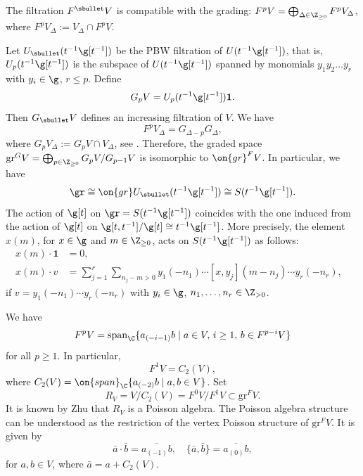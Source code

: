 The filtration $F^\sbullet V$
is compatible with the grading:
$F^pV=\bigoplus_{\Delta\in \Z_{\geq 0}}F^pV_{\Delta}$,
where
$F^p V_\Delta := V_\Delta \cap F^p V$.

Let $U_{\sbullet}(t^{-1}\g[t^{-1}])$ be the PBW filtration of
$U(t^{-1}\g[t^{-1}])$,
that is,
$U_{p}(t^{-1}\g[t^{-1}])$
is the subspace of $U(t^{-1}\g[t^{-1}])$
spanned by monomials $y_{1} y_{2} \dots y_{r}$ with $y_i \in \g$,
$r\leq p$.
Define
\begin{equation*}
G_p V= U_{p}(t^{-1}\g[t^{-1}])\mathbf{1}.
\end{equation*}
Then $G_\sbullet V$ defines an increasing filtration of $V$.
We have
\begin{equation}
F^p V_{\Delta}=G_{\Delta-p}G_{\Delta},
\end{equation}
where
$G_p V_{\Delta}:=G_p V\cap V_{\Delta}$,
see \cite[Prop.\,2.6.1]{Ara12}.
Therefore,
the graded space $\mathrm{gr}^G V = \bigoplus_{p \in \Z_{\geq 0}}
G_p V/G_{p-1}V$ is isomorphic to $\on{gr}^F V$.
In particular,
we have
\[
\gr\cong \on{gr}U_{\sbullet}(t^{-1}\g[t^{-1}])\cong S(t^{-1}\g[t^{-1}]).
\]
The action of $\g[t]$ on $\gr=S(t^{-1}\g[t^{-1}])$
coincides with the one
induced from the action of $\g[t]$ on
$\g[t,t^{-1}]/\g[t] \cong t^{-1}\g[t^{-1}]$.
More precisely,
the element $x(m)$, for $x \in \g$ and $m \in \Z_{\geq 0}$,
acts on $S(t^{-1}\g[t^{-1}])$ as follows:
\begin{align}\nonumber
x(m)\cdot\mathbf{1} &=0, & \\\label{eq:action}
x(m) \cdot v &= \sum_{j=1}^r
\sum_{n_{j}-m >0} y_{1}(-n_1)\cdots
[x,y_{{j}}] (m- n_{j})
\cdots y_{r}(-n_r),
\end{align}
if $v =y_{1}(-n_1)\cdots y_{r}(-n_r)$
with $y_i \in \g$, $n_1,\dots,n_r \in \Z_{>0}$.

\label{sub:Zhu affine vertex algebras}

We have \cite[Lem.\,2.9]{Li05}
\[
F^p V = \mathrm{span}_\C\{ a_{(-i-1)} b \mid a \in V,\, i \geq 1,\, b \in F^{p-i} V \}
\]
for all $p \geq 1$. In particular,
\[
F^1 V = C_2(V),
\]
where $C_2(V)=\on{span}_{\C}\{a_{(-2)}b\mid a,b\in V\}$.
Set
\[
R_V = V/C_2(V) = F^0 V / F^1 V \subset \mathrm{gr}^FV.
\]
It is known by Zhu \cite{Zhu96} that $R_V$ is a Poisson algebra.
The Poisson algebra structure can be understood as the restriction of the vertex Poisson structure of $\mathrm{gr}^FV$. It is given by
\[
\bar a \cdot \bar b = \overline{a_{(-1)} b}, \quad \{\bar a, \bar b\}= \overline{a_{(0)}b},
\]
for $a, b \in V$, where $\bar a = a+C_2(V)$.

